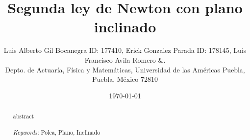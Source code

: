 \documentclass{article}
\begin{document}

\renewcommand{\footrulewidth}{1pt}
\renewcommand{\tablename}{Tabla}
\renewcommand{\figurename}{Figura}


\title{Segunda ley de Newton con plano inclinado}
\author{\small{Luis Alberto Gil Bocanegra ID: 177410, Erick Gonzalez Parada ID: 178145, Luis Francisco Avila Romero $\&$.}\\		%
	   \small{Depto. de Actuaría, Física y Matemáticas, Universidad de las Américas Puebla, Puebla, M\'exico 72810}}
\date{\small{\today}}

\maketitle


\begin{abstract}
abstract
\\
\\
{\it Keywords:}  Polea, Plano, Inclinado 
\\
\\
\end{abstract}

\end{document}
